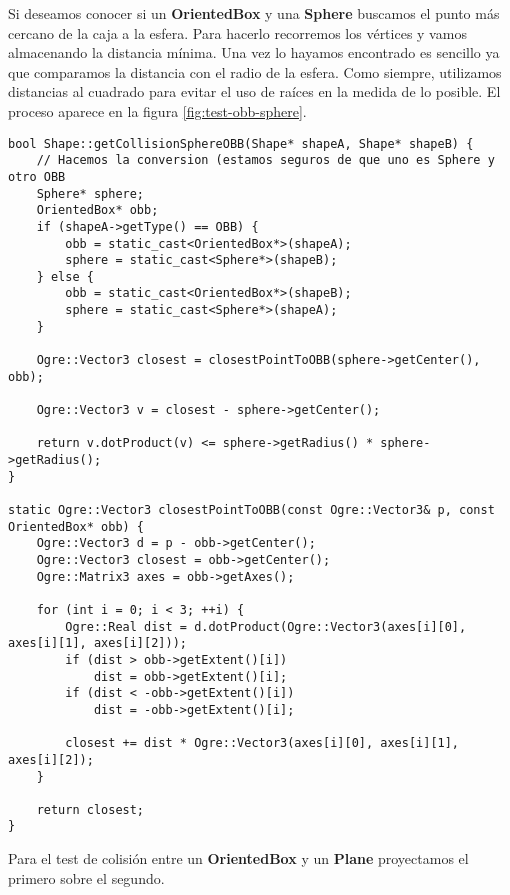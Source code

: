 Si deseamos conocer si un \textbf{OrientedBox} y una \textbf{Sphere} buscamos
el punto más cercano de la caja a la esfera. Para hacerlo recorremos los vértices
y vamos almacenando la distancia mínima. Una vez lo hayamos encontrado
es sencillo ya que comparamos la distancia con el radio de la esfera. Como siempre,
utilizamos distancias al cuadrado para evitar el uso de raíces en la medida
de lo posible. El proceso aparece en la figura \ref{fig:test-obb-sphere}.\\


\begin{lstlisting}[style=C++]
bool Shape::getCollisionSphereOBB(Shape* shapeA, Shape* shapeB) {
    // Hacemos la conversion (estamos seguros de que uno es Sphere y otro OBB
    Sphere* sphere;
    OrientedBox* obb;
    if (shapeA->getType() == OBB) {
        obb = static_cast<OrientedBox*>(shapeA);
        sphere = static_cast<Sphere*>(shapeB);
    } else {
        obb = static_cast<OrientedBox*>(shapeB);
        sphere = static_cast<Sphere*>(shapeA);
    }

    Ogre::Vector3 closest = closestPointToOBB(sphere->getCenter(), obb);

    Ogre::Vector3 v = closest - sphere->getCenter();

    return v.dotProduct(v) <= sphere->getRadius() * sphere->getRadius();
}

static Ogre::Vector3 closestPointToOBB(const Ogre::Vector3& p, const OrientedBox* obb) {
    Ogre::Vector3 d = p - obb->getCenter();
    Ogre::Vector3 closest = obb->getCenter();
    Ogre::Matrix3 axes = obb->getAxes();

    for (int i = 0; i < 3; ++i) {
        Ogre::Real dist = d.dotProduct(Ogre::Vector3(axes[i][0], axes[i][1], axes[i][2]));
        if (dist > obb->getExtent()[i]) 
            dist = obb->getExtent()[i];
        if (dist < -obb->getExtent()[i]) 
            dist = -obb->getExtent()[i];

        closest += dist * Ogre::Vector3(axes[i][0], axes[i][1], axes[i][2]);
    }

    return closest;
}
\end{lstlisting}

Para el test de colisión entre un \textbf{OrientedBox} y un \textbf{Plane}
proyectamos el primero sobre el segundo.\\


